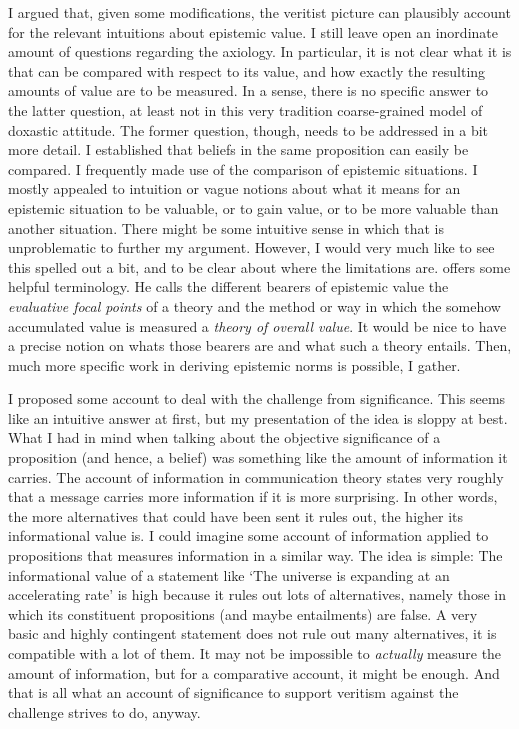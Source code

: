 \documentclass[12pt,numbers=noenddot]{scrartcl}
\begin{document}
I argued that, given some modifications, the veritist picture can plausibly account for the relevant intuitions about epistemic value. I still leave open an inordinate amount of questions regarding the axiology. In particular, it is not clear what it is that can be compared with respect to its value, and how exactly the resulting amounts of value are to be measured. In a sense, there is no specific answer to the latter question, at least not in this very tradition coarse-grained model of doxastic attitude. The former question, though, needs to be addressed in a bit more detail. I established that beliefs in the same proposition can easily be compared. I frequently made use of the comparison of epistemic situations. I mostly appealed to intuition or vague notions about what it means for an epistemic situation to be valuable, or to gain value, or to be more valuable than another situation. There might be some intuitive sense in which that is unproblematic to further my argument. However, I would very much like to see this spelled out a bit, and to be clear about where the limitations are. \textcite{Berker2013-BERETA-2} offers some helpful terminology. He calls the different bearers of epistemic value the \emph{evaluative focal points} of a theory and the method or way in which the somehow accumulated value is measured a \emph{theory of overall value}. It would be nice to have a precise notion on whats those bearers are and what such a theory entails. Then, much more specific work in deriving epistemic norms is possible, I gather.

I proposed some account to deal with the challenge from significance. This seems like an intuitive answer at first, but my presentation of the idea is sloppy at best. What I had in mind when talking about the objective significance of a proposition (and hence, a belief) was something like the amount of information it carries. The account of information in communication theory states very roughly that a message carries more information if it is more surprising. In other words, the more alternatives that could have been sent it rules out, the higher its informational value is. I could imagine some account of information applied to propositions that measures information in a similar way. The idea is simple: The informational value of a statement like ‘The universe is expanding at an accelerating rate’ is high because it rules out lots of alternatives, namely those in which its constituent propositions (and maybe entailments) are false. A very basic and highly contingent statement does not rule out many alternatives, it is compatible with a lot of them. It may not be impossible to \emph{actually} measure the amount of information, but for a comparative account, it might be enough. And that is all what an account of significance to support veritism against the challenge strives to do, anyway.
\end{document}
